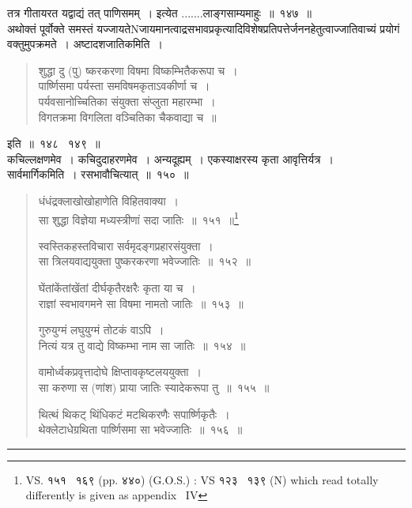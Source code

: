 \documentclass[11pt, openany]{book}
\begin{document}
तत्र गीतायरत यद्वाद्यं तत् पाणिसमम्~। इत्येत .......लाङ्गसाम्यमाहुः~॥~१४७~॥\\

अथोक्तं पूर्वोक्ते समस्तं यज्जायतेNजायमानत्वाद्रसभावप्रकृत्यादिविशेषप्रतिपत्तेर्जननहेतुत्वाज्जातिवाच्यं प्रयोगं वक्तुमुपक्रमते~। {\qtt अष्टादशजातिकमिति}~।

\begin{quote}
{\qt शुद्धा दु (पु) ष्करकरणा विषमा विष्कम्भितैकरूपा च~।\\
 पार्ष्णिसमा पर्यस्ता समविषमकृताऽवकीर्णा च~।\\
पर्यवसानोच्चितिका संयुक्ता संप्लुता महारम्भा~।\\
विगतक्रमा विगलिता वञ्चितिका चैकवाद्या च~॥}
\end{quote}

\noindent
इति~॥~१४८ \textendash\ १४९~॥\\

{\qtt कचिल्लक्षणमेव}~। कचिदुदाहरणमेव~। अन्यदूह्यम्~। एकस्याक्षरस्य कृता आवृत्तिर्यत्र~। {\qtt सार्वमार्गिकमिति}~। रसभावौचित्यात्~॥~१५०~॥

\newpage

\begin{quote}
{\na धंधंद्रक्लाखोखोहाणेति विहितवाक्या~।\\
सा शुद्धा विज्ञेया मध्यस्त्रीणां सदा जातिः~॥~१५१~॥\renewcommand{\thefootnote}{1}\footnote{VS. १५१ \textendash\ १६९ (pp. ४४०) (G.O.S.) : VS १२३ \textendash\ १३९ (N) which read totally differently is given as appendix \textendash\ IV}

स्वस्तिकहस्तविचारा सर्वमृदङ्गप्रहारसंयुक्ता~।\\
सा त्रिलयवाद्ययुक्ता पुष्करकरणा भवेज्जातिः~॥~१५२~॥

घेंतांकेंतांखेंतां दीर्घकृतैरक्षरैः कृता या च~।\\
राज्ञां स्वभावगमने सा विषमा नामतो जातिः~॥~१५३~॥

गुरुयुग्मं लघुयुग्मं तोटकं वाऽपि~।\\
नित्यं यत्र तु वाद्ये विष्कम्भा नाम सा जातिः~॥~१५४~॥

वामोर्ध्वकप्रवृत्तादोघे क्षिप्तावकृष्टलययुक्ता~।\\
सा करुणा स (णांश) प्राया जातिः स्यादेकरूपा तु~॥~१५५~॥

थित्थं थिकट् थिंधिकटं मटथिकरणैः सपार्ष्णिकृतैः~।\\
थेक्लेटाधेग्रथिता पार्ष्णिसमा सा भवेज्जातिः~॥~१५६~॥}
\end{quote}

\hrule
 
\end{document}

